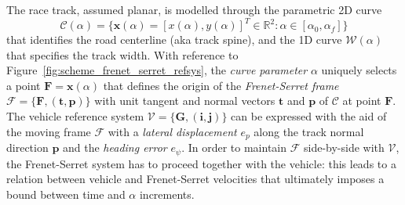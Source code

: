 \documentclass[conference]{IEEEtran} %
\renewcommand{\vec}[1]{\boldsymbol{#1}}
\DeclarePairedDelimiter{\norm}{\lVert}{\rVert}
\begin{document}
The race track, assumed planar, is modelled through the parametric 2D curve
\begin{equation}
\mathcal C(\alpha) = \{ \vec x (\alpha) = [x(\alpha), y(\alpha)]^T \in \mathbb{R}^2 : \alpha \in [\alpha_0, \alpha_f] \}
\end{equation}
%
that identifies the road centerline (aka track spine), and the 1D curve $\mathcal W(\alpha)$ that specifies the track width.
With reference to Figure~\ref{fig:scheme_frenet_serret_refsys}, the \emph{curve parameter} $\alpha$ uniquely selects a point $\vec F = \vec x(\alpha)$ that defines the origin of the \emph{Frenet-Serret frame} $\mathcal F = \{ \vec F, (\vec t, \vec p) \}$ with unit tangent and normal vectors $\vec t$ and $\vec p$ of $\mathcal C$ at point $\vec F$.
%
The vehicle reference system $\mathcal V = \{ \vec G, (\vec i, \vec j) \}$ can be expressed with the aid of the moving frame $\mathcal F$ with a \emph{lateral displacement} $e_p$ along the track normal direction $\vec p$ and the \emph{heading error} $e_\psi$.
In order to maintain $\mathcal F$ side-by-side with $\mathcal V$, the Frenet-Serret system has to proceed together with the vehicle: this leads to a relation between vehicle and Frenet-Serret velocities that ultimately imposes a bound between time and $\alpha$ increments.

%
\end{document}
